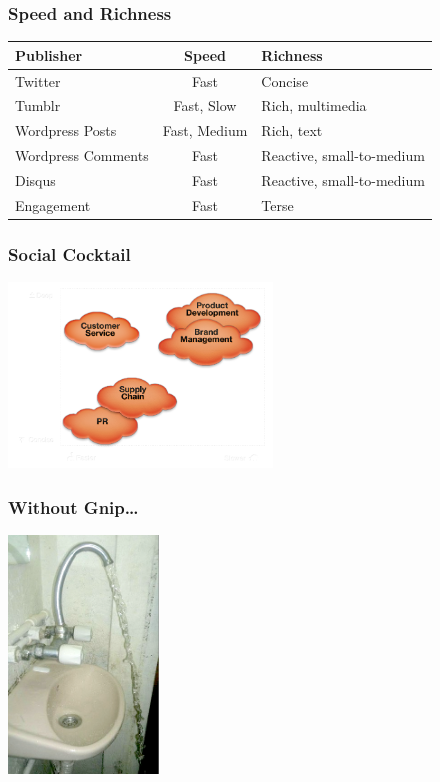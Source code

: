 \documentclass{beamer}
\begin{document}

\begin{frame} \frametitle{Speed and Richness}
\begin{table}
\begin{tabular}{m{2cm}| c |m{3cm}}
\hline
   {Publisher}   &   {Speed} & {Richness} \\
\hline 
    Twitter       & Fast & Concise  \\ [3pt]
    Tumblr       & Fast, Slow & Rich, multimedia\\  [3pt]
    Wordpress Posts & Fast, Medium &  Rich, text\\  [3pt]
    Wordpress Comments  & Fast & Reactive, small-to-medium\\  [3pt]
    Disqus         & Fast & Reactive, small-to-medium\\  [3pt]
    Engagement   & Fast & Terse\\ 
\hline
\end{tabular}
\end{table}
\end{frame}


\begin{frame}\frametitle{Social Cocktail}
  \begin{center}
    \includegraphics[width=7cm]{./imgs/socialcocktailgrid.png}
  \end{center}
\end{frame}


\begin{frame}\frametitle{Without Gnip\ldots}
  \begin{center}
    \includegraphics[width=4cm]{./imgs/sinkfail.png}
  \end{center}
\end{frame}
\end{document}
